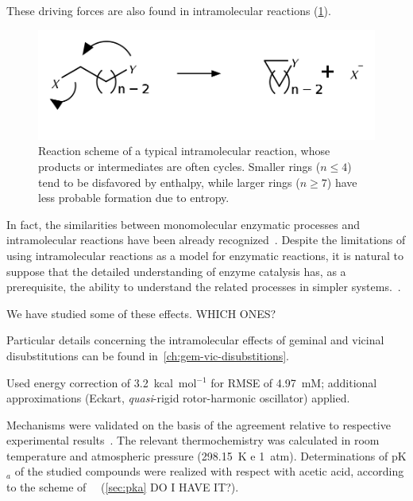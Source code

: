 These driving forces are also found in intramolecular reactions (\cref{fig:reacoes-intramoleculares}).
%
\begin{figure}[hbtp]
	\centering
	\includegraphics[width=.6\textwidth]{figures/reacao-intramolecular}
	\caption[Typical scheme of an intramolecular reactions]{
		Reaction scheme of a typical intramolecular reaction,
		whose products or
		intermediates are often cycles.
		Smaller rings ($n \le 4 $)
		tend to be disfavored by enthalpy,
		while larger rings ($n \ge 7 $)
		have less probable formation due to entropy.}%
	\label{fig:reacoes-intramoleculares}
\end{figure}
%
In fact,
the similarities between monomolecular enzymatic processes and
intramolecular reactions have been already recognized~\cite{Nilsson_1933,Bruice_1960b,Jung_1990}.
Despite the limitations of using intramolecular reactions as a model for
enzymatic reactions,
it is natural to suppose that the detailed understanding
of enzyme catalysis has,
as a prerequisite,
the ability to understand the
related processes in simpler systems.~\cite{Kirby_1972}.

We have studied some of these effects.
WHICH ONES?\@

Particular details concerning the intramolecular effects of geminal and
vicinal disubstitutions can be found in~\cref{ch:gem-vic-disubstitions}.



Used energy correction of 3.2~kcal~mol$^{-1}$ for RMSE of 4.97~mM;\@
additional approximations (Eckart,
\emph{quasi}-rigid rotor-harmonic oscillator) applied.

Mechanisms were validated on the basis of the agreement relative to respective experimental results~\cite{Kirby_1972,Jung_2005}.
The relevant thermochemistry was calculated in room temperature and atmospheric pressure (298.15~K e 1~atm).
Determinations of pK$_a$ of the studied compounds were realized with respect with acetic acid,
according to the scheme of~\citeauthor{Ding_2009}~\cite{Ding_2009} (\cref{sec:pka} DO I HAVE IT?).

